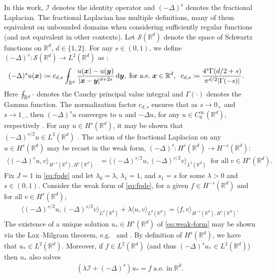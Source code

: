 \documentclass[10pt,a4paper]{article}
\newcommand{\vect}[1]{\boldsymbol{#1}}
\def\Xint#1{\mathchoice
{\XXint\displaystyle\textstyle{#1}}%
{\XXint\textstyle\scriptstyle{#1}}%
{\XXint\scriptstyle\scriptscriptstyle{#1}}%
{\XXint\scriptscriptstyle\scriptscriptstyle{#1}}%
\!\int}
\def\XXint#1#2#3{{\setbox0=\hbox{$#1{#2#3}{\int}$}
\vcenter{\hbox{$#2#3$}}\kern-.5\wd0}}
\def\dashint{\Xint-}
\numberwithin{equation}{section}
\begin{document}
In this work, $\mathcal{I}$ denotes the identity operator and $(-\Delta)^{s}$ denotes the fractional Laplacian. The fractional Laplacian has multiple definitions, many of them equivalent on unbounded domains when considering sufficiently regular functions \cite{Kwasnicki2017} (and not equivalent in other contexts).  Let $\mathcal{S}(\mathbb{R}^d)$ denote the space of Schwartz functions on $\mathbb{R}^d$, $d \in \{1,2\}$. For any $s \in (0,1)$, we define $(-\Delta)^{s} : \mathcal{S}(\mathbb{R}^d) \to L^2(\mathbb{R}^d)$ as \cite[Sec.~3]{Di2012}:
\begin{align}
(-\Delta)^{s} u(\vect{x}) &\coloneqq c_{d,s} \,\,  \dashint_{\mathbb{R}^d} \frac{u(\vect{x}) - u(\vect{y})}{|\vect{x}-\vect{y}|^{d+2s}} \, \mathrm{d}\vect{y}, \; \text{for a.e.} \; \vect{x} \in \mathbb{R}^d, \;\;
c_{d,s} \coloneqq \frac{4^{s} \Gamma(d/2+s)}{\pi^{d/2} |\Gamma(-s)|}. \label{def:fracLap}
\end{align} 
Here $\dashint_{\mathbb{R}^d} \cdot$ denotes the Cauchy principal value integral \cite[Ch.~2.4]{King2009a} and $\Gamma(\cdot)$ denotes the Gamma function. The normalization factor $c_{d,s}$ ensures that as $s\to 0_+$ and $s \to 1_-$, then $(-\Delta)^s u$ converges to $u$ and $-\Delta u$, for any $u\in C^\infty_0(\mathbb{R}^d)$, respectively \cite[Prop.~4.4]{Di2012}. For any $u \in H^{s}(\mathbb{R}^d)$, it may be shown that $(-\Delta)^{s/2}u \in L^2(\mathbb{R}^d)$ \cite[Prop.~3.6]{Di2012}. The action of the fractional Laplacian  on any $u \in H^s(\mathbb{R}^d)$  may be recast in the weak form, $(-\Delta)^{s}: H^{s}(\mathbb{R}^d) \to H^{-s}(\mathbb{R}^d)$:
\begin{align}
\langle (-\Delta)^{s} u, v \rangle_{H^{-s}(\mathbb{R}^d),H^{s}(\mathbb{R}^d)} &= \langle (-\Delta)^{s/2} u,(-\Delta)^{s/2}  v \rangle_{L^2(\mathbb{R}^d)} \;\; \text{for all} \; v \in H^{s}(\mathbb{R}^d). \label{eq:weak}
\end{align}
 Fix $J=1$ in \cref{eq:fpde} and let $\lambda_0 = \lambda$, $\lambda_1 = 1$, and $s_1 = s$ for some $\lambda > 0$ and $s \in (0,1)$.  Consider the weak form of \cref{eq:fpde}, for a given $f \in H^{-s}(\mathbb{R}^d)$ and for all $v \in H^{s}(\mathbb{R}^d)$,
\begin{align}
 \langle (-\Delta)^{s/2} u,(-\Delta)^{s/2}  v \rangle_{L^2(\mathbb{R}^d)} + \lambda \langle u, v \rangle_{L^2(\mathbb{R}^d)} = \langle f, v \rangle _{H^{-s}(\mathbb{R}^d),H^{s}(\mathbb{R}^d)}. \label{eq:weak-form}
\end{align}
The existence of a unique solution $u_* \in H^{s}(\mathbb{R}^d)$ of \cref{eq:weak-form} may be shown via the Lax--Milgram theorem, e.g.~\cite[Sec.~2.2]{Mao2017} and \cite[Thm.~2.2]{Papadopoulos2022e}. By definition of $H^{s}(\mathbb{R}^d)$, we have that $u_* \in L^2(\mathbb{R}^d)$. Moreover, if $f \in L^2(\mathbb{R}^d)$ (and thus $(-\Delta)^{s} u_* \in L^2(\mathbb{R}^d)$) then $u_*$ also solves \cite[Th.~1.1]{Kwasnicki2017}
\begin{align}
(\lambda \mathcal{I} + (-\Delta)^{s}) u_* = f \; \text{a.e.~in} \; \mathbb{R}^d. \label{eq:strong}
\end{align}
\end{document}
